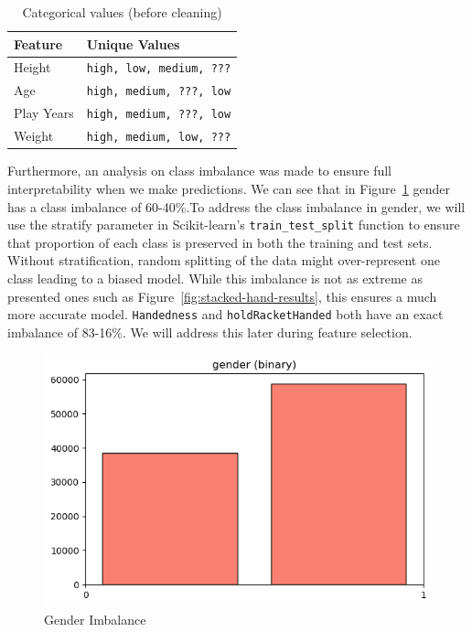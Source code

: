 \documentclass[10pt,twocolumn]{article}
\begin{document}
\begin{table}[H]
\centering
\caption{Categorical values (before cleaning)}
\begin{tabular}{|l|l|}
\hline
\textbf{Feature} & \textbf{Unique Values} \\
\hline
Height     & \texttt{high, low, medium, ???} \\
Age        & \texttt{high, medium, ???, low} \\
Play Years & \texttt{high, medium, ???, low} \\
Weight     & \texttt{high, medium, low, ???} \\
\hline
\end{tabular}
\label{tab:cat-values}
\end{table}
Furthermore, an analysis on class imbalance was made to ensure full interpretability when we make predictions. We can see that in Figure~\ref{fig:stacked-results} gender has a class imbalance of 60-40\%.To address the class imbalance in gender, we will use the stratify parameter in Scikit-learn's \texttt{train\_test\_split}
 function to ensure that proportion of each class is preserved in both the training and test sets. Without stratification, random splitting of the data might over-represent one class leading to a biased model. While this imbalance is not as extreme as  presented ones such as Figure~\ref{fig:stacked-hand-results}, this ensures a much more accurate model. \texttt{Handedness} and \texttt{holdRacketHanded} both have an exact imbalance of 83-16\%. We will address this later during feature selection. 

\begin{figure}[H]
    \centering
    \includegraphics[width=0.85\linewidth]{images/gender.png}
    \caption{Gender Imbalance}
    \label{fig:stacked-results}
\end{figure}
\end{document}
